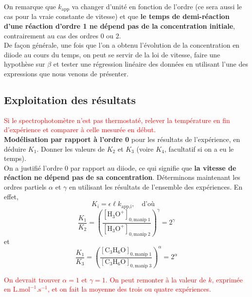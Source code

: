 \documentclass[11pt,a4paper]{report}
\begin{document}
On remarque que $k_\text{app}$ va changer d'unité en fonction de l'ordre (ce sera aussi le cas pour la vraie constante de vitesse) et que \textbf{le temps de demi-réaction d'une réaction d'ordre 1 ne dépend pas de la concentration initiale}, contrairement au cas des ordres 0 ou 2.\\ 

De façon générale, une fois que l'on a obtenu l'évolution de la concentration en diiode au cours du temps, on peut se servir de la loi de vitesse, faire une hypothèse sur $\beta$ et tester une régression linéaire des données en utilisant l'une des expressions que nous venons de présenter.

\subsection{Exploitation des résultats}

\textcolor{red}{Si le spectrophotomètre n'est pas thermostaté, relever la température en fin d'expérience et comparer à celle mesurée en début.}\\

\textbf{Modélisation par rapport à l'ordre 0} pour les résultats de l'expérience, en déduire $K_1$. Donner les valeurs de $K_2$ et $K_3$ (voire $K_4$, facultatif si on a eu le temps).\\

On a justifié l'ordre 0 par rapport au diiode, ce qui signifie que \textbf{la vitesse de réaction ne dépend pas de sa concentration}. Déterminons maintenant les ordres partiels $\alpha$ et $\gamma$ en utilisant les résultats de l'ensemble des expériences. En effet,
\begin{equation}
	K_i = \epsilon \ell k_\text{app,i},\quad\text{d'où}\quad
\end{equation}
\begin{equation}
	\frac{K_1}{K_2} 
	= \left(\frac{[\text{H}_3\text{O}^+]_{0,\text{manip}\;1}}
	{[\text{H}_3\text{O}^+]_{0,\text{manip}\;2}}\right)^\gamma = 2^\gamma
\end{equation}
et
\begin{equation}
	\frac{K_1}{K_3}
	=  \left(\frac{[\text{C}_3\text{H}_6\text{O}]_{0,\text{manip}\;1}}
	{[\text{C}_3\text{H}_6\text{O}]_{0,\text{manip}\;3}}\right)^\alpha = 2^\alpha
\end{equation}

\textcolor{red}{On devrait trouver $\alpha = 1$ et $\gamma = 1$. On peut remonter à la valeur de $k$, exprimée en $\text{L}.\text{mol}^{-1}.\text{s}^{-1}$, et on fait la moyenne des trois ou quatre expériences.}
\end{document}

